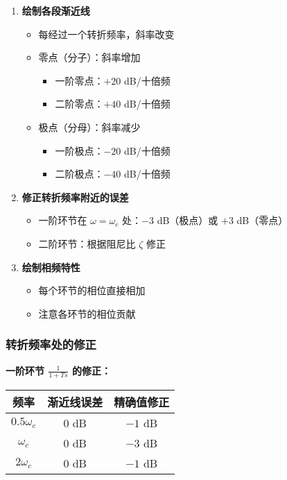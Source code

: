 \begin{enumerate}
    \item \textbf{绘制各段渐近线}
    \begin{itemize}
        \item 每经过一个转折频率，斜率改变
        \item 零点（分子）：斜率增加
        \begin{itemize}
            \item 一阶零点：$+20$ dB/十倍频
            \item 二阶零点：$+40$ dB/十倍频
        \end{itemize}
        \item 极点（分母）：斜率减少
        \begin{itemize}
            \item 一阶极点：$-20$ dB/十倍频
            \item 二阶极点：$-40$ dB/十倍频
        \end{itemize}
    \end{itemize}
    
    \item \textbf{修正转折频率附近的误差}
    \begin{itemize}
        \item 一阶环节在 $\omega = \omega_c$ 处：$-3$ dB（极点）或 $+3$ dB（零点）
        \item 二阶环节：根据阻尼比 $\zeta$ 修正
    \end{itemize}
    
    \item \textbf{绘制相频特性}
    \begin{itemize}
        \item 每个环节的相位直接相加
        \item 注意各环节的相位贡献
    \end{itemize}
\end{enumerate}

\subsubsection{转折频率处的修正}

\textbf{一阶环节 $\frac{1}{1+Ts}$ 的修正：}

\begin{center}
\begin{tabular}{c|c|c}
\hline
频率 & 渐近线误差 & 精确值修正 \\
\hline
$0.5\omega_c$ & $0$ dB & $-1$ dB \\
$\omega_c$ & $0$ dB & $-3$ dB \\
$2\omega_c$ & $0$ dB & $-1$ dB \\
\hline
\end{tabular}
\end{center}

